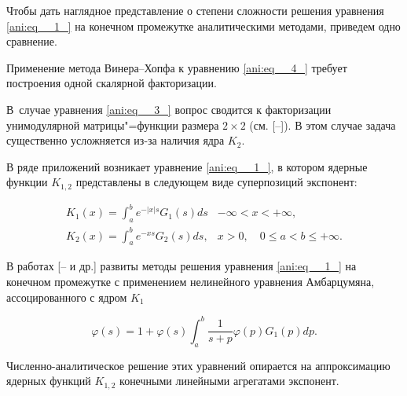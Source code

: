 Чтобы дать наглядное представление о степени сложности решения уравнения \eqref{ani:eq__1_} на конечном промежутке аналитическими методами, приведем одно сравнение. 

Применение метода Винера--Хопфа к уравнению \eqref{ani:eq__4_} требует построения одной скалярной факторизации.

В~случае уравнения \eqref{ani:eq__3_} вопрос сводится к факторизации унимодулярной матрицы"=функции размера $2\times 2$ (см. [--]). В этом случае задача существенно усложняется из-за наличия   ядра $K_{2} $.



В  ряде приложений  возникает уравнение  \eqref{ani:eq__1_}, в котором ядерные  функции  $K_{1,2} $ представлены в следующем виде суперпозиций экспонент:

\begin{equation} \label{ani:eq__5_}

 \begin{array}{ll} 

 \displaystyle K_{1} (x)=\int _{a}^{b}e^{- |x|  s}  G_{1}  (s) ds &  -\infty <x<+\infty ,

 \\ 

 \displaystyle K_{2}  (x) =\int _{a}^{b}e^{-xs} G_{2}  (s) ds,  & x>0 ,\quad 0\le a<b\le +\infty .

 \end{array}

 \end{equation}



В  работах [-- и др.] развиты  методы решения уравнения \eqref{ani:eq__1_} на конечном промежутке с применением  нелинейного уравнения Амбарцумяна, ассоцированного с ядром $K_1$

\begin{equation}\label{ani:eq6}

\varphi  (s) =1+\varphi  (s) \int _{a}^{b}\frac{1}{s+p} \varphi  (p) G_{1}  (p) dp .

\end{equation}



Численно-аналитическое решение этих уравнений опирается  на  аппроксимацию  ядерных функций $K_{1,2} $ конечными линейными агрегатами экспонент.



\smallskip



